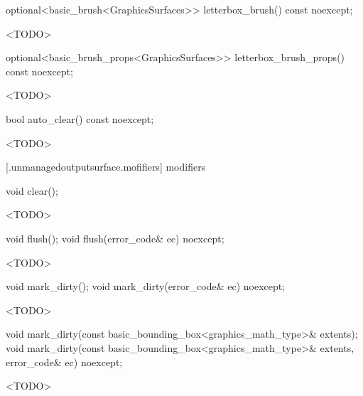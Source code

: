%
\begin{itemdecl}
optional<basic_brush<GraphicsSurfaces>> letterbox_brush() const noexcept;
\end{itemdecl}
\begin{itemdescr}
\pnum
\returns
<TODO>
\end{itemdescr}

%
\begin{itemdecl}
optional<basic_brush_props<GraphicsSurfaces>> letterbox_brush_props() const noexcept;
\end{itemdecl}
\begin{itemdescr}
\pnum
\returns
<TODO>
\end{itemdescr}

%
\begin{itemdecl}
bool auto_clear() const noexcept;
\end{itemdecl}
\begin{itemdescr}
\pnum
\returns
<TODO>
\end{itemdescr}

 [\iotwod.unmanagedoutputsurface.mofifiers] { modifiers}

%
\begin{itemdecl}
void clear();
\end{itemdecl}
\begin{itemdescr}
\pnum
\effects
<TODO>
\end{itemdescr}

%
\begin{itemdecl}
void flush();
void flush(error_code& ec) noexcept;
\end{itemdecl}
\begin{itemdescr}
\pnum
\effects
<TODO>
\end{itemdescr}

%
\begin{itemdecl}
void mark_dirty();
void mark_dirty(error_code& ec) noexcept;
\end{itemdecl}
\begin{itemdescr}
\pnum
\effects
<TODO>
\end{itemdescr}

%
\begin{itemdecl}
void mark_dirty(const basic_bounding_box<graphics_math_type>& extents);
void mark_dirty(const basic_bounding_box<graphics_math_type>& extents, error_code& ec) noexcept;
\end{itemdecl}
\begin{itemdescr}
\pnum
\effects
<TODO>
\end{itemdescr}

